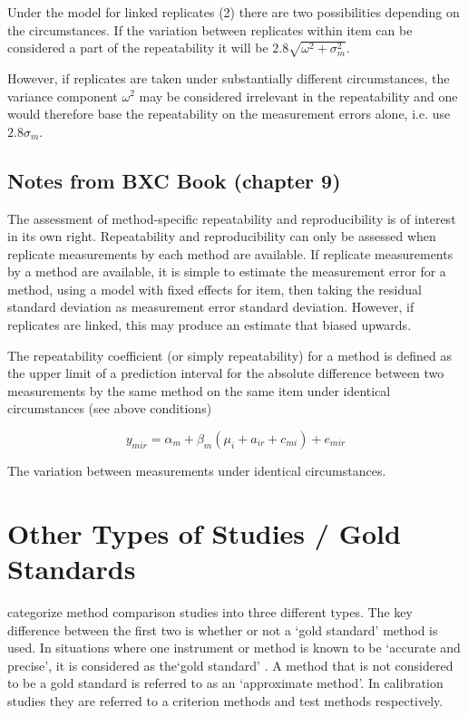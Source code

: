 \documentclass[12pt, a4paper]{report}
\theoremstyle{plain}
\theoremstyle{definition}
\theoremstyle{remark}
\begin{document}
		
 Under the model for linked replicates (2) there are two
		possibilities depending on the circumstances.
If the variation between replicates within item can be
		considered a part of the repeatability it will be $2.8 \sqrt{
			\omega^2 + \sigma^2_m}$.

 However, if replicates are taken under substantially
		different circumstances, the variance component $\omega^2$ may be
		considered irrelevant in the repeatability and one would therefore
		base the repeatability on the measurement errors alone, i.e. use
		$2.8 \sigma_m$.


	\subsection{Notes from BXC Book (chapter 9)}
	The assessment of method-specific repeatability and reproducibility is of interest in its own right.
	Repeatability and reproducibility can only be assessed when replicate measurements by each method are available.
	If replicate measurements by a method are available, it is simple to estimate the measurement error for a method, using a model with fixed effects for item, then taking the residual standard deviation as measurement error standard deviation.
	However, if replicates are linked, this may produce an estimate that biased upwards.
	
	The repeatability coefficient (or simply repeatability) for a method is defined as the upper limit of a
	prediction interval for the absolute difference between two measurements by the same method on the same
	item under identical circumstances (see above conditions)
	
	\[y_{mir}  = \alpha_{m} + \beta_m( \mu_i + a_{ir} + c_{mi}) + e_{mir}\]
	
	The variation between measurements under identical circumstances.
	

	
	



	\section{Other Types of Studies / Gold Standards}
	\citet{lewis} categorize method comparison studies into three
	different types.  The key difference between the first two is
	whether or not a `gold standard' method is used. In situations
	where one instrument or method is known to be `accurate and
	precise', it is considered as the`gold standard' \citep{lewis}. A
	method that is not considered to be a gold standard is referred to
	as an `approximate method'. In calibration studies they are
	referred to a criterion methods and test methods respectively.
	
\end{document}
